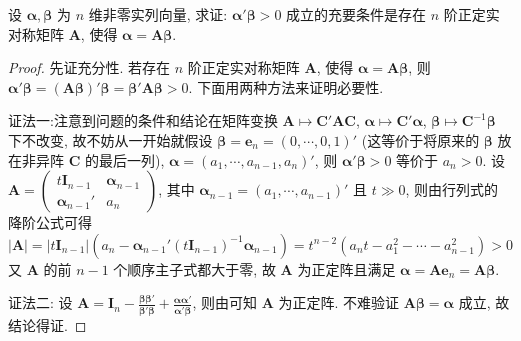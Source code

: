 \documentclass[../../main.tex]{subfiles}
\begin{document}
\begin{proposition}
设 \(\boldsymbol{\alpha},\boldsymbol{\beta}\) 为 \(n\) 维非零实列向量, 求证: \(\boldsymbol{\alpha}'\boldsymbol{\beta}>0\) 成立的充要条件是存在 \(n\) 阶正定实对称矩阵 \(\boldsymbol{A}\), 使得 \(\boldsymbol{\alpha}=\boldsymbol{A}\boldsymbol{\beta}\).
\end{proposition}
\begin{proof}
先证充分性. 若存在 \(n\) 阶正定实对称矩阵 \(\boldsymbol{A}\), 使得 \(\boldsymbol{\alpha}=\boldsymbol{A}\boldsymbol{\beta}\), 则 \(\boldsymbol{\alpha}'\boldsymbol{\beta}=(\boldsymbol{A}\boldsymbol{\beta})'\boldsymbol{\beta}=\boldsymbol{\beta}'\boldsymbol{A}\boldsymbol{\beta}>0\). 下面用两种方法来证明必要性.

{\color{blue}证法一:}注意到问题的条件和结论在矩阵变换 \(\boldsymbol{A}\mapsto\boldsymbol{C}'\boldsymbol{A}\boldsymbol{C}\), \(\boldsymbol{\alpha}\mapsto\boldsymbol{C}'\boldsymbol{\alpha}\), \(\boldsymbol{\beta}\mapsto\boldsymbol{C}^{-1}\boldsymbol{\beta}\) 下不改变, 故不妨从一开始就假设 \(\boldsymbol{\beta}=\boldsymbol{e}_n=(0,\cdots,0,1)'\) (这等价于将原来的 \(\boldsymbol{\beta}\) 放在非异阵 \(\boldsymbol{C}\) 的最后一列), \(\boldsymbol{\alpha}=(a_1,\cdots,a_{n - 1},a_n)'\), 则 \(\boldsymbol{\alpha}'\boldsymbol{\beta}>0\) 等价于 \(a_n>0\). 设 \(\boldsymbol{A}=\begin{pmatrix}t\boldsymbol{I}_{n - 1}&\boldsymbol{\alpha}_{n - 1}\\\boldsymbol{\alpha}_{n - 1}'&a_n\end{pmatrix}\), 其中 \(\boldsymbol{\alpha}_{n - 1}=(a_1,\cdots,a_{n - 1})'\) 且 \(t\gg0\), 则由行列式的降阶公式可得
\[|\boldsymbol{A}|=|t\boldsymbol{I}_{n - 1}|(a_n-\boldsymbol{\alpha}_{n - 1}'(t\boldsymbol{I}_{n - 1})^{-1}\boldsymbol{\alpha}_{n - 1})=t^{n - 2}(a_nt - a_1^2-\cdots - a_{n - 1}^2)>0\]
又 \(\boldsymbol{A}\) 的前 \(n - 1\) 个顺序主子式都大于零, 故 \(\boldsymbol{A}\) 为正定阵且满足 \(\boldsymbol{\alpha}=\boldsymbol{A}\boldsymbol{e}_n=\boldsymbol{A}\boldsymbol{\beta}\).

{\color{blue}证法二:} 设 \(\boldsymbol{A}=\boldsymbol{I}_n-\frac{\boldsymbol{\beta}\boldsymbol{\beta}'}{\boldsymbol{\beta}'\boldsymbol{\beta}}+\frac{\boldsymbol{\alpha}\boldsymbol{\alpha}'}{\boldsymbol{\alpha}'\boldsymbol{\beta}}\), 则由可知 \(\boldsymbol{A}\) 为正定阵. 不难验证 \(\boldsymbol{A}\boldsymbol{\beta}=\boldsymbol{\alpha}\) 成立, 故结论得证.

\end{proof}
\end{document}
